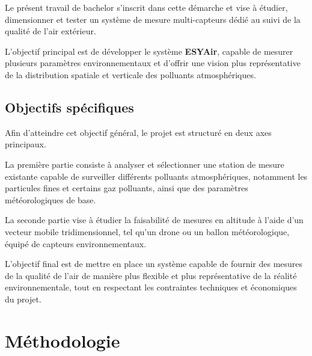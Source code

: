 Le présent travail de bachelor s'inscrit dans cette démarche et vise à étudier, dimensionner et tester un système de mesure multi-capteurs dédié au suivi de la qualité de l'air extérieur.

L'objectif principal est de développer le système \textbf{ESYAir}, capable de mesurer plusieurs paramètres environnementaux et d'offrir une vision plus représentative de la distribution spatiale et verticale des polluants atmosphériques.

\subsection{Objectifs spécifiques}

Afin d'atteindre cet objectif général, le projet est structuré en deux axes principaux.

La première partie consiste à analyser et sélectionner une station de mesure existante capable de surveiller différents polluants atmosphériques, notamment les particules fines et certains gaz polluants, ainsi que des paramètres météorologiques de base.

La seconde partie vise à étudier la faisabilité de mesures en altitude à l'aide d'un vecteur mobile tridimensionnel, tel qu'un drone ou un ballon météorologique, équipé de capteurs environnementaux.

L'objectif final est de mettre en place un système capable de fournir des mesures de la qualité de l'air de manière plus flexible et plus représentative de la réalité environnementale, tout en respectant les contraintes techniques et économiques du projet.

\section{Méthodologie}



